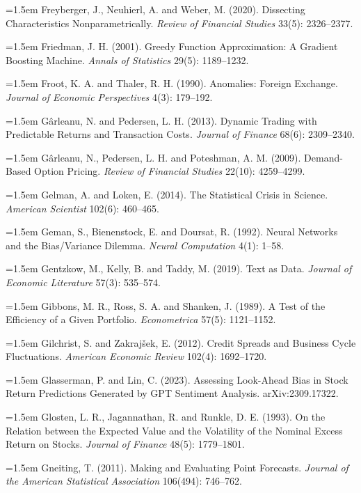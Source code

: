 \hangindent=1.5em Freyberger, J., Neuhierl, A. and Weber, M. (2020). Dissecting Characteristics Nonparametrically. \emph{Review of Financial Studies} 33(5): 2326--2377.

\hangindent=1.5em Friedman, J. H. (2001). Greedy Function Approximation: A Gradient Boosting Machine. \emph{Annals of Statistics} 29(5): 1189--1232.

\hangindent=1.5em Froot, K. A. and Thaler, R. H. (1990). Anomalies: Foreign Exchange. \emph{Journal of Economic Perspectives} 4(3): 179--192.

\hangindent=1.5em G\^arleanu, N. and Pedersen, L. H. (2013). Dynamic Trading with Predictable Returns and Transaction Costs. \emph{Journal of Finance} 68(6): 2309--2340.

\hangindent=1.5em G\^arleanu, N., Pedersen, L. H. and Poteshman, A. M. (2009). Demand-Based Option Pricing. \emph{Review of Financial Studies} 22(10): 4259--4299.

\hangindent=1.5em Gelman, A. and Loken, E. (2014). The Statistical Crisis in Science. \emph{American Scientist} 102(6): 460--465.

\hangindent=1.5em Geman, S., Bienenstock, E. and Doursat, R. (1992). Neural Networks and the Bias/Variance Dilemma. \emph{Neural Computation} 4(1): 1--58.

\hangindent=1.5em Gentzkow, M., Kelly, B. and Taddy, M. (2019). Text as Data. \emph{Journal of Economic Literature} 57(3): 535--574.

\hangindent=1.5em Gibbons, M. R., Ross, S. A. and Shanken, J. (1989). A Test of the Efficiency of a Given Portfolio. \emph{Econometrica} 57(5): 1121--1152.

\hangindent=1.5em Gilchrist, S. and Zakraj\v{s}ek, E. (2012). Credit Spreads and Business Cycle Fluctuations. \emph{American Economic Review} 102(4): 1692--1720.

\hangindent=1.5em Glasserman, P. and Lin, C. (2023). Assessing Look-Ahead Bias in Stock Return Predictions Generated by GPT Sentiment Analysis. arXiv:2309.17322.

\hangindent=1.5em Glosten, L. R., Jagannathan, R. and Runkle, D. E. (1993). On the Relation between the Expected Value and the Volatility of the Nominal Excess Return on Stocks. \emph{Journal of Finance} 48(5): 1779--1801.

\hangindent=1.5em Gneiting, T. (2011). Making and Evaluating Point Forecasts. \emph{Journal of the American Statistical Association} 106(494): 746--762.

